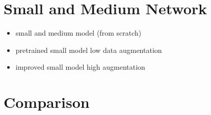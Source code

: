 \section{Small and Medium Network}

\begin{itemize}
	\item small and medium model (from scratch)
	\item pretrained small model low data augmentation 
	\item improved small model high augmentation
\end{itemize}

\section{Comparison}